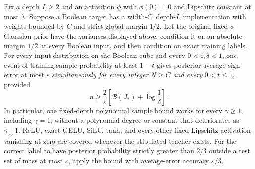 \begin{theorem}
\label{thm:uniform-all-scales}
Fix a depth $L\ge2$ and an activation $\phi$ with $\phi(0)=0$ and
Lipschitz constant at most $\lambda$. Suppose a Boolean target has a
width-$C$, depth-$L$ implementation with weights bounded by $C$ and
strict global margin $1/2$. Let the original fixed-$\phi$ Gaussian prior
have the variances displayed above, condition it on an absolute margin
$1/2$ at every Boolean input, and then condition on exact training labels.
For every input distribution on the Boolean cube and every
$0<\varepsilon,\delta<1$, one event of training-sample probability at
least $1-\delta$ gives posterior average sign error at most $\varepsilon$
\emph{simultaneously for every integer $N\ge C$ and every $0<t\le1$},
provided
\[
 n\ge\frac2\varepsilon
 \left[\mathcal B(J_*)+\log\frac1\delta\right].
\]
In particular, one fixed-depth polynomial sample bound works for every
$\gamma\ge1$, including $\gamma=1$, without a polynomial degree or
constant that deteriorates as $\gamma\downarrow1$.
ReLU, exact GELU, SiLU, tanh, and every other fixed Lipschitz activation
vanishing at zero are covered whenever the stipulated teacher exists.
For the correct label to have posterior probability strictly greater
than $2/3$ outside a test set of mass at most $\varepsilon$, apply the
bound with average-error accuracy $\varepsilon/3$.
\end{theorem}
